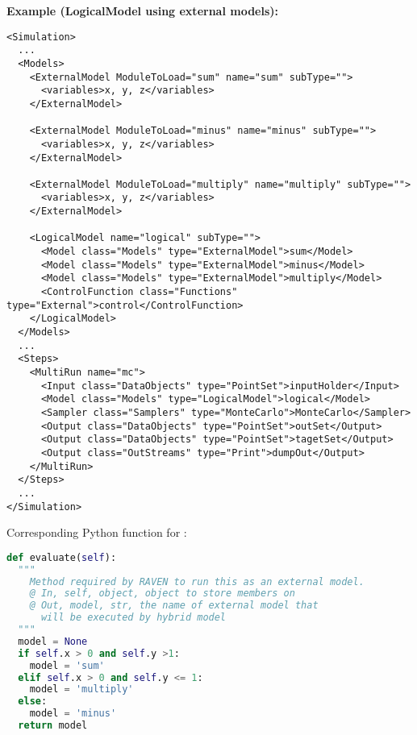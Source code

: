 \textbf{Example (LogicalModel using external models):}
\begin{lstlisting}[style=XML,morekeywords={subType,debug,name,class,type}]
<Simulation>
  ...
  <Models>
    <ExternalModel ModuleToLoad="sum" name="sum" subType="">
      <variables>x, y, z</variables>
    </ExternalModel>

    <ExternalModel ModuleToLoad="minus" name="minus" subType="">
      <variables>x, y, z</variables>
    </ExternalModel>

    <ExternalModel ModuleToLoad="multiply" name="multiply" subType="">
      <variables>x, y, z</variables>
    </ExternalModel>

    <LogicalModel name="logical" subType="">
      <Model class="Models" type="ExternalModel">sum</Model>
      <Model class="Models" type="ExternalModel">minus</Model>
      <Model class="Models" type="ExternalModel">multiply</Model>
      <ControlFunction class="Functions" type="External">control</ControlFunction>
    </LogicalModel>
  </Models>
  ...
  <Steps>
    <MultiRun name="mc">
      <Input class="DataObjects" type="PointSet">inputHolder</Input>
      <Model class="Models" type="LogicalModel">logical</Model>
      <Sampler class="Samplers" type="MonteCarlo">MonteCarlo</Sampler>
      <Output class="DataObjects" type="PointSet">outSet</Output>
      <Output class="DataObjects" type="PointSet">tagetSet</Output>
      <Output class="OutStreams" type="Print">dumpOut</Output>
    </MultiRun>
  </Steps>
  ...
</Simulation>

\end{lstlisting}

Corresponding Python function for :
\begin{lstlisting}[language=python]
def evaluate(self):
  """
    Method required by RAVEN to run this as an external model.
    @ In, self, object, object to store members on
    @ Out, model, str, the name of external model that
      will be executed by hybrid model
  """
  model = None
  if self.x > 0 and self.y >1:
    model = 'sum'
  elif self.x > 0 and self.y <= 1:
    model = 'multiply'
  else:
    model = 'minus'
  return model
\end{lstlisting}

